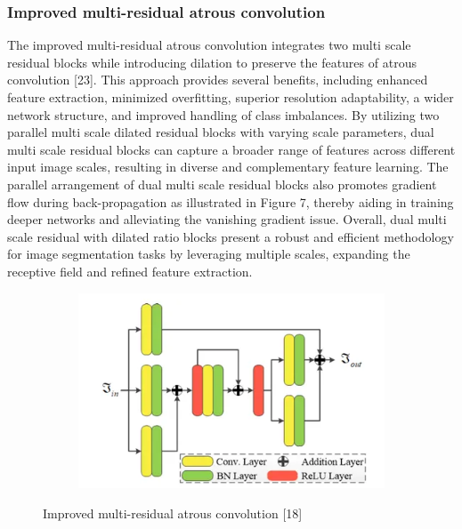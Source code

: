 \documentclass[conference]{IEEEtran}
\begin{document}
\subsubsection{Improved multi-residual atrous convolution}
The improved multi-residual atrous convolution integrates two multi scale residual blocks while introducing dilation to preserve the features of atrous convolution [23]. This approach provides several benefits, including enhanced feature extraction, minimized overfitting, superior resolution adaptability, a wider network structure, and improved handling of class imbalances. By utilizing two parallel multi scale dilated residual blocks with varying scale parameters, dual multi scale residual blocks can capture a broader range of features across different input image scales, resulting in diverse and complementary feature learning. The parallel arrangement of dual multi scale residual blocks also promotes gradient flow during back-propagation as illustrated in Figure 7, thereby aiding in training deeper networks and alleviating the vanishing gradient issue. Overall, dual multi scale residual with dilated ratio blocks present a robust and efficient methodology for image segmentation tasks by leveraging multiple scales, expanding the receptive field and refined feature extraction. 
\begin{figure}[h]
    \centering
    \begin{subfigure}[t]{0.4\textwidth}
        \centering
        \includegraphics[width=\textwidth]{group/Picture9.png}
    \end{subfigure}%
    \caption{Improved multi-residual atrous convolution [18]}
\end{figure}
\end{document}
